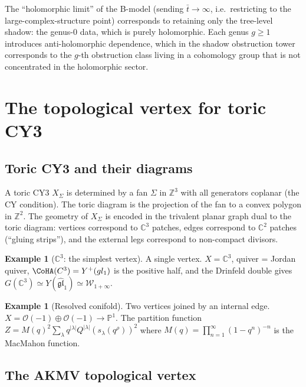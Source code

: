 \documentclass[11pt]{amsart}
\theoremstyle{plain}
\theoremstyle{definition}
\newtheorem{example}[theorem]{Example}
\theoremstyle{remark}
\begin{document}
\noindent
The ``holomorphic limit'' of the B-model (sending $\bar{t} \to \infty$,
i.e.\ restricting to the large-complex-structure point) corresponds to
retaining only the tree-level shadow: the genus-0 data, which is purely
holomorphic. Each genus $g \geq 1$ introduces anti-holomorphic dependence,
which in the shadow obstruction tower corresponds to the $g$-th obstruction class
living in a cohomology group that is not concentrated in the holomorphic
sector.


\section{The topological vertex for toric CY3}
\label{sec:top-vertex}

\subsection{Toric CY3 and their diagrams}
\label{sub:toric-cy3}

A toric CY3 $X_\Sigma$ is determined by a fan $\Sigma$ in $\mathbb{Z}^3$
with all generators coplanar (the CY condition). The toric diagram is the
projection of the fan to a convex polygon in $\mathbb{Z}^2$. The geometry
of $X_\Sigma$ is encoded in the trivalent planar graph dual to the toric
diagram: vertices correspond to $\mathbb{C}^3$ patches, edges correspond to
$\mathbb{C}^2$ patches (``gluing strips''), and the external legs correspond
to non-compact divisors.

\begin{example}[$\mathbb{C}^3$: the simplest vertex]
A single vertex. $X = \mathbb{C}^3$, quiver = Jordan quiver,
$\CoHA(\mathbb{C}^3)=Y^+(\widehat{\mathfrak{gl}}_1)$ is the positive
half, and the Drinfeld double gives
$G(\mathbb{C}^3)\simeq Y(\widehat{\mathfrak{gl}}_1)\simeq
\mathcal{W}_{1+\infty}$.
\end{example}

\begin{example}[Resolved conifold]
Two vertices joined by an internal edge. $X = \mathcal{O}(-1) \oplus \mathcal{O}(-1) \to \mathbb{P}^1$. The partition function $Z = M(q)^2 \sum_\lambda q^{|\lambda|} Q^{|\lambda|} (s_\lambda(q^\rho))^2$ where $M(q) = \prod_{n=1}^\infty (1-q^n)^{-n}$ is the MacMahon function.
\end{example}

\subsection{The AKMV topological vertex}
\label{sub:akmv}
\end{document}
